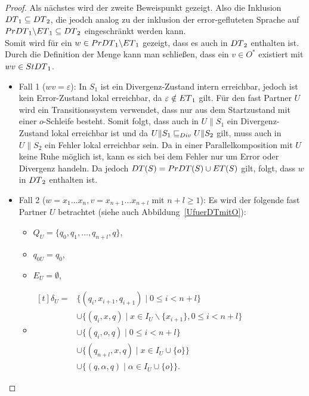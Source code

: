 \begin{proof}
  Als nächstes wird der zweite Beweispunkt gezeigt. Also die Inklusion
  $DT{}_1\subseteq DT{}_2$, die jeodch analog zu der inklusion der
  error-gefluteten Sprache auf $PrDT{}_1\backslash ET{}_1 \subseteq DT{}_2$
  eingeschränkt werden kann.\\
  Somit wird für ein $w\in PrDT{}_1\backslash ET{}_1$ gezeigt, dass es auch
  in $DT{}_2$ enthalten ist.\\
  Durch die Definition der Menge \PrDT{} kann man schließen, dass ein $v\in
  O^*$ existiert mit $wv\in StDT{}_1$.
  \begin{itemize}
  \item Fall 1 ($wv=\varepsilon$): In $S_1$ ist ein Divergenz-Zustand intern
    erreichbar, jedoch ist kein Error-Zustand lokal erreichbar, da
    $\varepsilon\notin ET{}_1$ gilt. Für den fast Partner $U$ wird ein
    Transitionssystem verwendet, dass nur aus dem Startzustand mit einer
    $o$-Schleife besteht. Somit folgt, dass auch in $U\|S_1$ ein
    Divergenz-Zustand lokal erreichbar ist und da $U\|S_1\sqsubseteq _{Div} U\|S_2$ gilt,
    muss auch in $U\|S_2$ ein Fehler lokal erreichbar sein. Da in einer
    Parallelkomposition mit $U$ keine Ruhe möglich ist, kann es sich bei dem
    Fehler nur um Error oder Divergenz handeln. Da jedoch $DT(S) =
    PrDT{}(S)\cup ET{}(S)$ gilt, folgt, dass $w$ in $DT{}_2$ enthalten ist.
  \item Fall 2 ($w=x_1\dots x_n, v=x_{n+1}\dots x_{n+l}$ mit $n+l\geq 1$): Es
    wird der folgende fast Partner $U$ betrachtet (siehe auch
    Abbildung~\ref{UfuerDTmitO}):
      \begin{itemize}
        \item $Q_U=\{q_0,q_1,\dots ,q_{n+l}, q\}$,
        \item $q_{0U}=q_0$,
        \item $E_U=\emptyset$,
        \item $\begin{aligned}[t]
            \delta _U=&\{(q_i,x_{i+1},q_{i+1})\mid  0\leq i< n+l\}\\
                      &\cup\{(q_i,x,q)\mid  x\in I_U\backslash\{x_{i+1}\},
          0\leq i< n+l\}\\
                      &\cup\{(q_i,o,q)\mid 0\leq i< n+l\}\\
                      &\cup\{(q_{n+l},x,q)\mid x\in I_U\cup\{o\}\}\\
                      &\cup\{(q,\alpha,q)\mid \alpha\in I_U\cup\{o\}\}.
        \end{aligned}$
      \end{itemize}
      \begin{figure} [h!tbp]
      \begin{center}
\end{center}
\end{figure}
\end{itemize}
\end{proof}

